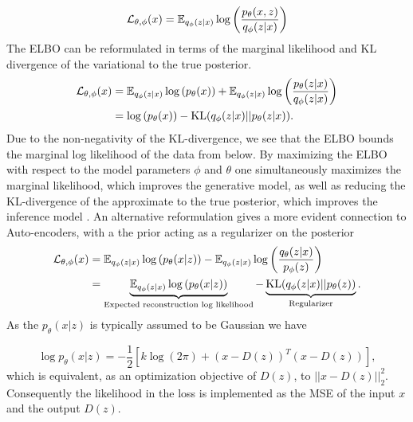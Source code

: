 \documentclass[../../thesis.tex]{subfiles}
\begin{document}
\begin{equation}
    \label{eq:ELBO}
    \mathcal{L}_{\theta,\phi}(x) 
    = \mathbb{E}_{q_\phi(z|x)} \log \left( \frac{p_\theta(x,z)}{q_\phi(z|x)}\right)
\end{equation}
The ELBO can be reformulated in terms of the marginal likelihood and KL divergence of the variational to the true posterior.
\begin{equation}
    \begin{aligned}
        \label{eq:ELBO_loglik}
        \mathcal{L}_{\theta,\phi}(x) 
        &=  \mathbb{E}_{q_\phi(z|x)} \log \left( p_\theta(x)\right) + \mathbb{E}_{q_\phi(z|x)} \log \left( \frac{p_\theta(z|x)}{q_\phi(z|x)}\right) \\
        &= \log \left( p_\theta(x)\right) - \textrm{KL}(q_\phi(z|x)|| p_\theta(z|x)).
    \end{aligned}
\end{equation}
Due to the non-negativity of the KL-divergence, we see that the ELBO bounds the marginal log likelihood of the data from below. By maximizing the ELBO with respect to the model parameters $\phi$ and $\theta$ one simultaneously maximizes the marginal likelihood, which improves the generative model, as well as reducing the KL-divergence of the approximate to the true posterior, which improves the inference model \cite{VAE}.\newline
An alternative reformulation gives a more evident connection to Auto-encoders, with a the prior acting as a regularizer on the posterior 
\begin{equation}
    \begin{aligned}
        \label{eq:ELBO_AE}
        \mathcal{L}_{\theta,\phi}(x) 
        &=  \mathbb{E}_{q_\phi(z|x)} \log \left( p_\theta(x|z)\right) - \mathbb{E}_{q_\phi(z|x)} \log \left( \frac{q_\theta(z|x)}{p_\phi(z)}\right) \\
        &= \underbrace{\mathbb{E}_{q_\phi(z|x)} \log \left( p_\theta(x|z)\right)}_{\text{Expected reconstruction log likelihood}} - \underbrace{\textrm{KL}(q_\phi(z|x)|| p_\theta(z))}_{\text{Regularizer}}.
    \end{aligned}
\end{equation}
As the $p_\theta(x|z)$ is typically assumed to be Gaussian we have

\begin{equation}
    \log p_\theta(x|z) = -\frac12 \left[k\log(2\pi)+ (x-D(z))^T(x-D(z))\right],
\end{equation}
which is equivalent, as an optimization objective of $D(z)$, to $||x-D(z)||_2^2$. Consequently the likelihood in the loss is implemented as the MSE of the input $x$ and the output $D(z)$.
\end{document}
